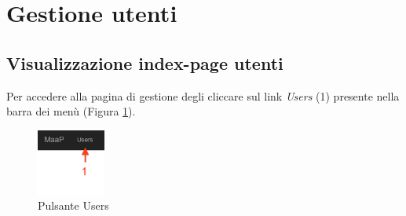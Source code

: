\clearpage
\section{Gestione utenti}
\label{gestioneutenti}
	


	\subsection{Visualizzazione index-page utenti} %
	\label{visualizzaindexpageutenti}

			\label{pulsanteusers} Per accedere alla pagina di gestione degli  cliccare sul link \emph{Users} (1) presente nella barra dei menù (Figura \ref{fig:pulsanteusers}).

				\begin{figure}[H]
					\centering \includegraphics[width=0.2\textwidth]{img/usersButton.png}
					\caption{ \label{fig:pulsanteusers} Pulsante Users}
				\end{figure}





	\clearpage
